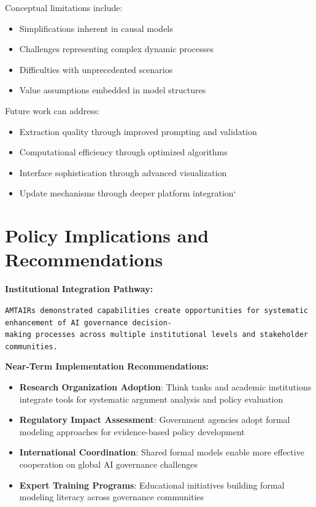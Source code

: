 \documentclass[
  11pt,
  letterpaper,
]{book}
\providecommand{\tightlist}{%
  \setlength{\itemsep}{0pt}\setlength{\parskip}{0pt}}
\begin{document}
Conceptual limitations include:

\begin{itemize}
\tightlist
\item
  Simplifications inherent in causal models
\item
  Challenges representing complex dynamic processes
\item
  Difficulties with unprecedented scenarios
\item
  Value assumptions embedded in model structures
\end{itemize}

Future work can address:

\begin{itemize}
\tightlist
\item
  Extraction quality through improved prompting and validation
\item
  Computational efficiency through optimized algorithms
\item
  Interface sophistication through advanced visualization
\item
  Update mechanisms through deeper platform integration`
\end{itemize}

\section{Policy Implications and
Recommendations}\label{sec-policy-implications}

\textbf{Institutional Integration Pathway:}

\texttt{AMTAIR\textquotesingle{}s\ demonstrated\ capabilities\ create\ opportunities\ for\ systematic\ enhancement\ of\ AI\ governance\ decision-making\ processes\ across\ multiple\ institutional\ levels\ and\ stakeholder\ communities.}

\textbf{Near-Term Implementation Recommendations:}

\begin{itemize}
\tightlist
\item
  \textbf{Research Organization Adoption}: Think tanks and academic
  institutions integrate tools for systematic argument analysis and
  policy evaluation
\item
  \textbf{Regulatory Impact Assessment}: Government agencies adopt
  formal modeling approaches for evidence-based policy development
\item
  \textbf{International Coordination}: Shared formal models enable more
  effective cooperation on global AI governance challenges
\item
  \textbf{Expert Training Programs}: Educational initiatives building
  formal modeling literacy across governance communities
\end{itemize}
\end{document}
